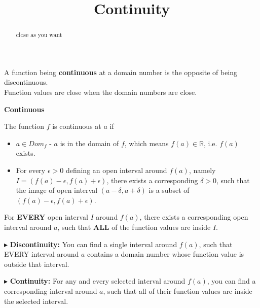 \documentclass{ximera}
\title{Continuity}
\begin{document}
\begin{abstract}
close as you want
\end{abstract}
\maketitle






A function being \textbf{continuous} at a domain number is the opposite of being discontinuous. \\


Function values are close when the domain numbers are close.










\begin{definition} \textbf{\textcolor{green!50!black}{Continuous}}

The function $f$ is continuous at $a$ if


\begin{itemize}
\item $a \in Dom_f$ - $a$ is in the domain of $f$, which means $f(a) \in \mathbb{R}$, i.e. $f(a)$ exists.
\item For every $\epsilon > 0$ defining an open interval around $f(a)$, namely $I = (f(a) - \epsilon, f(a) + \epsilon)$, there exists a corresponding $\delta > 0$, such that the image of open interval $(a - \delta, a + \delta)$ is a subset of $(f(a)-\epsilon, f(a)+\epsilon)$.
\end{itemize}


For \textbf{\textcolor{red!70!black}{EVERY}} open interval $I$ around $f(a)$, there exists a corresponding open interval around $a$, such that \textbf{\textcolor{red!70!black}{ALL}} of the function values are inside $I$.


\end{definition}





$\blacktriangleright$ \textbf{Discontinuity:}  You can find a single interval around $f(a)$, such that EVERY interval around $a$ contains a domain number whose function value is outside that interval.


$\blacktriangleright$ \textbf{Continuity:} For any and every selected interval around $f(a)$, you can find a corresponding interval around $a$, such that all of their function values are inside the selected interval.
\end{document}
